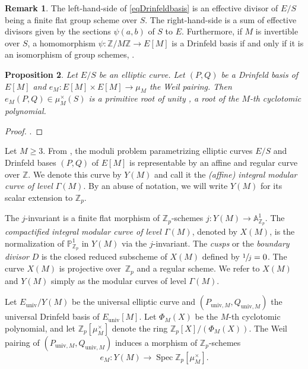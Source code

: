 \documentclass[JEP,XML,SOM,Unicode,published]{cedram}
\newcommand{\univ}{\mathrm{univ}}
\numberwithin{equation}{section}
\newtheorem{prop}{Proposition}[section]
\theoremstyle{definition}
\newtheorem{remark}[prop]{Remark}
\newcommand{\bb}[1]{\mathbb{#1}}
\DeclareMathOperator{\Spec}{Spec}
\begin{document}
\begin{remark}
The left-hand-side of \eqref{eqDrinfeldbasis} is an effective divisor of $E/S$ being a finite flat group scheme over $S$. The right-hand-side is a sum of effective divisors given by the sections $\psi(a,b)$ of $S$ to $E$. Furthermore, if $M$ is invertible over $S$, a homomorphism $\psi: \bb{Z}/M\bb{Z}\to E[M]$ is a Drinfeld basis if and only if it is an isomorphism of group schemes, \cf \cite[Lem.\,1.5.3]{katz1985arithmetic}.
\end{remark}

\begin{prop}
Let $E/S$ be an elliptic curve. Let $(P,Q)$ be a Drinfeld basis of $E[M]$ and $e_M: E[M]\times E[M]\to \mu_M$ the Weil pairing. Then $e_M(P,Q)\in \mu_M^\times(S)$ is a primitive root of unity , \ie a root of the $M$-th cyclotomic polynomial.
\end{prop}

\begin{proof}
\cite[Th.\,5.6.3]{katz1985arithmetic}.
\end{proof}

Let $M\geq 3$. From \cite[Th.\,5.1.1 \& Sch.\,4.7.0]{katz1985arithmetic}, the moduli problem parametrizing elliptic curves $E/S$ and Drinfeld bases $(P,Q)$ of $E[M]$ is representable by an affine and regular curve over $\bb{Z}$. We denote this curve by $Y(M)$ and call it the \textit{(affine) integral modular curve of level $\Gamma(M)$}. By an abuse of notation, we will write $Y(M)$ for its scalar extension to $\bb{Z}_p$.

The $j$-invariant is a finite flat morphism of $\bb{Z}_p$-schemes $j:Y(M)\to \bb{A}^1_{\bb{Z}_p}$. The \textit{compactified integral modular curve of level $\Gamma(M)$}, denoted by $X(M)$, is the normalization of $\bb{P}^1_{\bb{Z}_p}$ in $Y(M)$ via the $j$-invariant. The \textit{cusps} or the \textit{boundary divisor} $D$ is the closed reduced subscheme of $X(M)$ defined by $\sfrac{1}{j}=0$. The curve $X(M)$ is projective over~$\bb{Z}_p$ and a regular scheme.
We refer to $X(M)$ and $Y(M)$ simply as the modular curves of level $\Gamma(M)$.

Let $E_{\univ}/Y(M)$ be the universal elliptic curve and $(P_{\univ,M},Q_{\univ,M})$ the universal Drinfeld basis of $E_{\univ}[M]$. Let $\Phi_{M}(X)$ be the $M$-th cyclotomic polynomial, and let $\bb{Z}_p[\mu^{\times}_{M}]$ denote the ring $\bb{Z}_p[X]/(\Phi_{M}(X))$. The Weil pairing of $(P_{\univ,M},Q_{\univ,M})$ induces a morphism of $\bb{Z}_p$-schemes
\[
e_M:Y(M)\to \Spec \bb{Z}_p[\mu_{M}^{\times}].
\]
\end{document}
